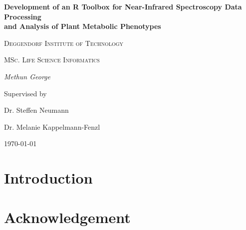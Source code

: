 \documentclass[12pt,a4paper]{report}
\begin{document}
\begin{titlepage}
    \centering
    {\huge\bfseries Development of an R Toolbox for Near-Infrared Spectroscopy Data Processing \\
    and Analysis of Plant Metabolic Phenotypes\par}
    \vspace{2cm}
    {\LARGE \textsc{Deggendorf Institute of Technology}\par}
    \vspace{1cm}
    {\Large \textsc{MSc. Life Science Informatics}\par}
    \vspace{1.5cm}
    {\Large\itshape Methun George\par}
    \vfill
    Supervised by\par
    Dr. Steffen Neumann\par
    Dr. Melanie Kappelmann-Fenzl
    \vfill
    {\large \today\par}
\end{titlepage}

\newpage

\chapter*{Introduction}

\chapter*{Acknowledgement}
\end{document}
